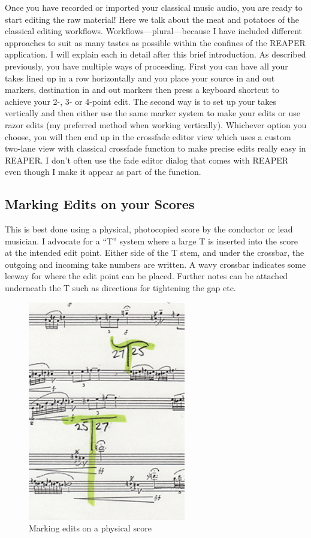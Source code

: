 \documentclass[10pt,american]{article}
\begin{document}
Once you have recorded or imported your classical music audio, you are ready to
start editing the raw material! Here we talk about the meat and potatoes of the
classical editing workflows. Workflows---plural---because I have included
different approaches to suit as many tastes as possible within the confines of
the REAPER application. I will explain each in detail after this brief
introduction. As described previously, you have multiple ways of proceeding.
First you can have all your takes lined up in a row horizontally and you place
your source in and out markers, destination in and out markers then press a
keyboard shortcut to achieve your 2-, 3- or 4-point edit. The second way is to
set up your takes vertically and then either use the same marker system to make
your edits or use razor edits (my preferred method when working vertically).
Whichever option you choose, you will then end up in the crossfade editor view
which uses a custom two-lane view with classical crossfade function to make
precise edits really easy in REAPER. I don't often use the fade editor dialog
that comes with REAPER even though I make it appear as part of the function.

\subsection{Marking Edits on your Scores}

This is best done using a physical, photocopied score by the conductor or lead
musician. I advocate for a \textquotedblleft T\textquotedblright{} system where
a large T is inserted into the score at the intended edit point. Either side of
the T stem, and under the crossbar, the outgoing and incoming take numbers are
written. A wavy crossbar indicates some leeway for where the edit point can be
placed. Further notes can be attached underneath the T such as directions for
tightening the gap etc.

\begin{figure}
\begin{centering}
\includegraphics{user_guide_images/score-edits}
\par\end{centering}
\caption{Marking edits on a physical score}

\end{figure}
\end{document}
